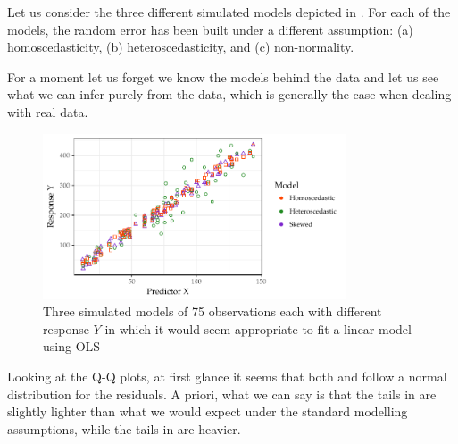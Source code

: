 \bigskip
\begin{example}
	Let us consider the three different simulated models depicted in . For each of the models, the random error has been built under a different assumption: (a) homoscedasticity, (b) heteroscedasticity, and (c) non-normality.

	For a moment let us forget we know the models behind the data and let us see what we can infer purely from the data, which is generally the case when dealing with real data.

	\begin{figure}[H]
		\centering
		\includegraphics[width=0.8\textwidth]{./images/models-example}
		\caption{Three simulated models of 75 observations each with different response $Y$ in which it would seem appropriate to fit a linear model using OLS}
		\label{fig:models-example}
	\end{figure}

	Looking at the Q-Q plots, at first glance it seems that both  and  follow a normal distribution for the residuals. A priori, what we can say is that the tails in  are slightly lighter than what we would expect under the standard modelling assumptions, while the tails in  are heavier.


\end{example}
